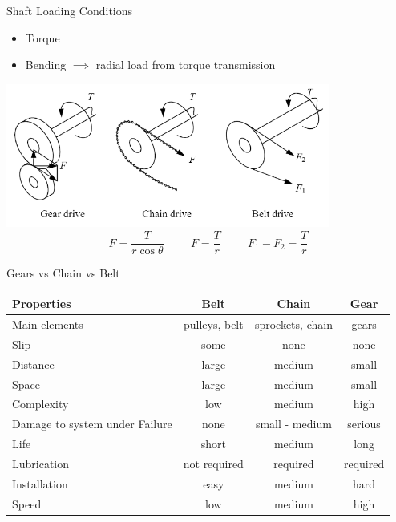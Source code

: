 \documentclass[
svgnames,
handout,
10pt,
]{beamer}
\begin{document}
\begin{frame}{Shaft Loading Conditions}
  \begin{itemize}
  \item Torque
  \item Bending $\implies$ radial load from torque transmission
  \end{itemize}
  \centering
  \includegraphics[width=0.8\textwidth]{pictures/torque-transmission}
  $$ F = \dfrac{T}{r \cos \theta} \hspace{1cm} F = \dfrac{T}{r} \hspace{1cm} F_1 - F_2 = \dfrac{T}{r} $$
\end{frame}

\begin{frame}{Gears vs Chain vs Belt}
  \begin{table}[htbp]
    \centering
    \begin{tabular}{lccc}
      \toprule
      Properties & Belt & Chain & Gear \\
      \midrule
      Main elements & pulleys, belt & sprockets, chain & gears \\
      \midrule
      Slip & some & none & none \\
      \midrule
      Distance & large & medium & small \\
      \midrule
      Space & large & medium & small \\
      \midrule
      Complexity & low & medium & high \\
      \midrule
      \multirow{2}{3cm}{Damage to system under Failure} & \multirow{2}{*}{none} & \multirow{2}{*}{small - medium} & \multirow{2}{*}{serious} \\
      &&& \\
      \midrule
      Life & short & medium & long \\
      \midrule
      Lubrication & not required & required & required \\
      \midrule
      Installation & easy & medium & hard \\
      \midrule
      Speed & low & medium & high \\
      \bottomrule
    \end{tabular}
  \end{table}
\end{frame}
\end{document}
